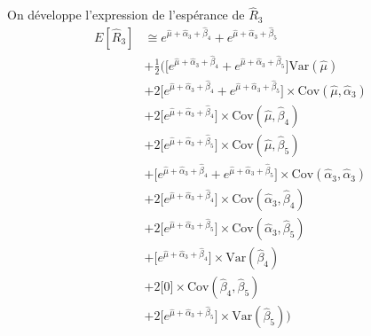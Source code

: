 On développe l'expression de l'espérance de $\widehat{R}_3$
\begin{align*}
E[\widehat{R}_3] & \cong e^{\widehat{\mu} + \widehat{\alpha}_3 + \widehat{\beta}_4} +  e^{\widehat{\mu} + \widehat{\alpha}_3 + \widehat{\beta}_5} \\
& + \frac{1}{2} \Bigg( \Big[ e^{\widehat{\mu} + \widehat{\alpha}_3 + \widehat{\beta}_4} +  e^{\widehat{\mu} + \widehat{\alpha}_3 + \widehat{\beta}_5} \Big] \text{Var}(\widehat{\mu}) \\
& + 2 \Big[ e^{\widehat{\mu} + \widehat{\alpha}_3 + \widehat{\beta}_4} +  e^{\widehat{\mu} + \widehat{\alpha}_3 + \widehat{\beta}_5} \Big] \times \text{Cov}(\widehat{\mu}, \widehat{\alpha}_3) \\
& + 2 \Big[ e^{\widehat{\mu} + \widehat{\alpha}_3 + \widehat{\beta}_4}  \Big] \times \text{Cov}(\widehat{\mu}, \widehat{\beta}_4)\\
& + 2 \Big[ e^{\widehat{\mu} + \widehat{\alpha}_3 + \widehat{\beta}_5}  \Big] \times \text{Cov}(\widehat{\mu}, \widehat{\beta}_5)\\
& + \Big[ e^{\widehat{\mu} + \widehat{\alpha}_3 + \widehat{\beta}_4} +  e^{\widehat{\mu} + \widehat{\alpha}_3 + \widehat{\beta}_5} \Big] \times \text{Cov}(\widehat{\alpha}_3, \widehat{\alpha}_3) \\
& + 2 \Big[ e^{\widehat{\mu} + \widehat{\alpha}_3 + \widehat{\beta}_4}  \Big] \times \text{Cov}(\widehat{\alpha}_3, \widehat{\beta}_4)\\
& + 2 \Big[ e^{\widehat{\mu} + \widehat{\alpha}_3 + \widehat{\beta}_5}  \Big] \times \text{Cov}(\widehat{\alpha}_3, \widehat{\beta}_5)\\
& + \Big[ e^{\widehat{\mu} + \widehat{\alpha}_3 + \widehat{\beta}_4}  \Big] \times \text{Var}(\widehat{\beta}_4)\\
& + 2 \Big[ 0 \Big] \times \text{Cov}(\widehat{\beta}_4, \widehat{\beta}_5)\\
& + 2 \Big[ e^{\widehat{\mu} + \widehat{\alpha}_3 + \widehat{\beta}_5}  \Big] \times \text{Var}(\widehat{\beta}_5) \Bigg)
\end{align*}

